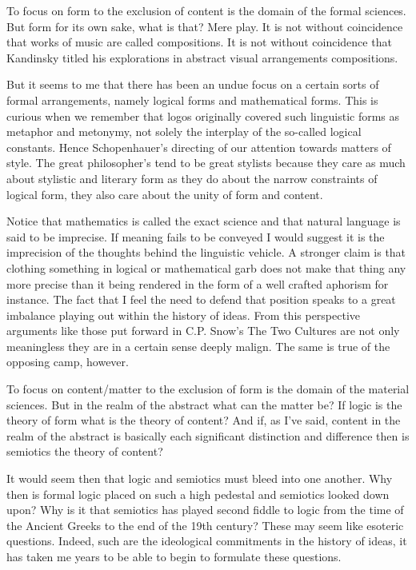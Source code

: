 \documentclass[dah,phd,a4paper]{xe_uccthesis}
\begin{document}
To focus on form to the exclusion of content is the domain of the formal sciences. But form for its own sake, what is that? Mere play. It is not without coincidence that works of music are called compositions. It is not without coincidence that Kandinsky titled his explorations in abstract visual arrangements compositions.

But it seems to me that there has been an undue focus on a certain sorts of formal arrangements, namely logical forms and mathematical forms. This is curious when we remember that logos originally covered such linguistic forms as metaphor and metonymy, not solely the interplay of the so-called logical constants. Hence Schopenhauer's directing of our attention towards matters of style. The great philosopher's tend to be great stylists because they care as much about stylistic and literary form as they do about the narrow constraints of logical form, they also care about the unity of form and content.

Notice that mathematics is called the exact science and that natural language is said to be imprecise. If meaning fails to be conveyed I would suggest it is the imprecision of the thoughts behind the linguistic vehicle. A stronger claim is that clothing something in logical or mathematical garb does not make that thing any more precise than it being rendered in the form of a well crafted aphorism for instance. The fact that I feel the need to defend that position speaks to a great imbalance playing out within the history of ideas. From this perspective arguments like those put forward in C.P. Snow's The Two Cultures are not only meaningless they are in a certain sense deeply malign. The same is true of the opposing camp, however.

To focus on content/matter to the exclusion of form is the domain of the material sciences. But in the realm of the abstract what can the matter be? If logic is the theory of form what is the theory of content? And if, as I've said, content in the realm of the abstract is basically each significant distinction and difference then is semiotics the theory of content?

It would seem then that logic and semiotics must bleed into one another. Why then is formal logic placed on such a high pedestal and semiotics looked down upon? Why is it that semiotics has played second fiddle to logic from the time of the Ancient Greeks to the end of the 19th century? These may seem like esoteric questions. Indeed, such are the ideological commitments in the history of ideas, it has taken me years to be able to begin to formulate these questions.
\end{document}
